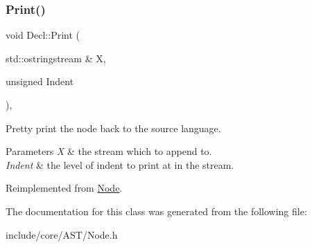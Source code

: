 \subsubsection{\texorpdfstring{Print()}{Print()}}
{\footnotesize\ttfamily void Decl\+::\+Print (\begin{DoxyParamCaption}\item[{std\+::ostringstream \&}]{X,  }\item[{unsigned}]{Indent }\end{DoxyParamCaption})\hspace{0.3cm}{\ttfamily [override]}, {\ttfamily [virtual]}}

Pretty print the node back to the source language. 
\begin{DoxyParams}{Parameters}
{\em X} & the stream which to append to. \\
\hline
{\em Indent} & the level of indent to print at in the stream. \\
\hline
\end{DoxyParams}


Reimplemented from \mbox{\hyperlink{class_node_a5325b760a6e6fe94227c0cff53af2c45}{Node}}.



The documentation for this class was generated from the following file\+:\begin{DoxyCompactItemize}
\item 
include/core/\+A\+S\+T/Node.\+h\end{DoxyCompactItemize}
